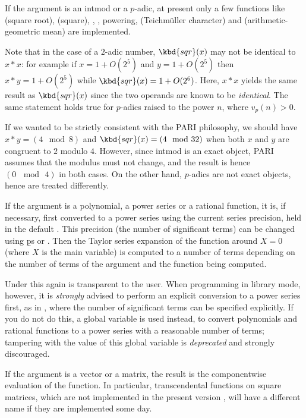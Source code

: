 \item If the argument is an intmod or a $p$-adic, at present only a
few functions like  (square root),  (square), ,
, powering,  (Teichm\"uller character) and
 (arithmetic-geometric mean) are implemented.

Note that in the case of a $2$-adic number, $\kbd{sqr}(x)$ may not be
identical to $x*x$: for example if $x = 1+O(2^5)$ and $y = 1+O(2^5)$ then
$x*y = 1+O(2^5)$ while $\kbd{sqr}(x) = 1+O(2^6)$. Here, $x * x$ yields the
same result as $\kbd{sqr}(x)$ since the two operands are known to be
\emph{identical}. The same statement holds true for $p$-adics raised to the
power $n$, where $v_p(n) > 0$.

 If we wanted to be strictly consistent with
the PARI philosophy, we should have $x*y = (4 \mod 8)$ and $\kbd{sqr}(x) =
(4 \mod 32)$ when both $x$ and $y$ are congruent to $2$ modulo $4$.
However, since intmod is an exact object, PARI assumes that the modulus
must not change, and the result is hence $(0\, \mod\, 4)$ in both cases. On
the other hand, $p$-adics are not exact objects, hence are treated
differently.

\item If the argument is a polynomial, a power series or a rational function,
it is, if necessary, first converted to a power series using the current
series precision, held in the default . This precision
(the number of significant terms) can be changed using \b{ps} or
. Then the Taylor series expansion of the
function around $X=0$ (where $X$ is the main variable) is computed to a
number of terms depending on the number of terms of the argument and the
function being computed.

Under  this again is transparent to the user. When programming in
library mode, however, it is \emph{strongly} advised to perform an explicit
conversion to a power series first, as in ,
where the number of significant terms  can be specified
explicitly. If you do not do this, a global variable  is used
instead, to convert polynomials and rational functions to a power series with
a reasonable number of terms; tampering with the value of this global
variable is \emph{deprecated} and strongly discouraged.


\item If the argument is a vector or a matrix, the result is the
componentwise evaluation of the function. In particular, transcendental
functions on square matrices, which are not implemented in the present
version \vers, will have a different name if they are implemented some day.

